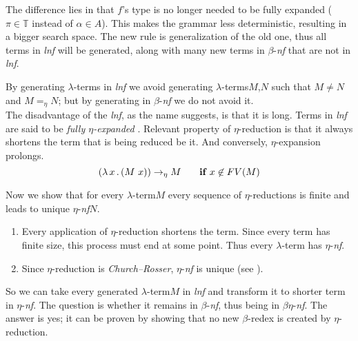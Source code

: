 \documentclass{sig-alternate}
\newcommand{\lterm}{$\lambda$-term\xspace}
\newcommand{\lterms}{$\lambda$-terms\xspace}
\newcommand{\lamb}[2]{( \lambda \, #1 \, . \, #2 )}
\newcommand{\ered}{$\eta$-reduction\xspace}
\newcommand{\bnf}{$\beta$-\textit{nf}\xspace}
\newcommand{\enf}{$\eta$-\textit{nf}\xspace}
\newcommand{\benf}{$\beta\eta$-\textit{nf}\xspace}
\newcommand{\bredex}{$\beta$-redex\xspace}
\newcommand{\lnf}{\textit{lnf}\xspace}
\newcommand{\T}{\mathbb{T}\xspace}
\begin{document}
The difference lies in that $f$'s type is no longer needed to be fully expanded
($\pi \in \T$ instead of $\alpha \in A$). This makes the grammar less deterministic,
resulting in a bigger search space. The new rule is generalization of the old one,
thus all terms in \lnf will be generated, along with many new terms in \bnf that 
are not in \lnf. 
    
By generating \lterms in \lnf we avoid generating 
\lterms $M$,$N$ such that $M \not= N$ and $M =_{\eta} N$; 
but by generating in \bnf we do not avoid it.\\


The disadvantage of the \lnf, as the name suggests, is that it is long.
Terms in \lnf are said to be \textit{fully $\eta$-expanded} \cite{barendregt10}. 
Relevant property of $\eta$-reduction is that it always shortens the term
that is being reduced be it. And conversely, $\eta$-expansion prolongs.
$$\lamb{x}{(M~x)} \eArrow M \textbf{ ~~~~if } x \not\in FV(M) $$

Now we show that for every \lterm $M$ 
every sequence of $\eta$-reductions is finite and
leads to unique \enf $N$.

\begin{enumerate}
 \item Every application of \ered shortens the term.
       Since every term has finite size, this process must 
       end at some point. Thus every \lterm has \enf.
 \item Since \ered is \textit{Church–Rosser}, \enf is unique (see \cite{barendregt84}). 
\end{enumerate}

So we can take every generated \lterm $M$ in 
\lnf and transform it to shorter term in \enf. 
The question is whether it remains in \bnf, thus being in \benf.
The answer is yes; it can be proven by showing that no 
new \bredex is created by \ered.  
\end{document}
